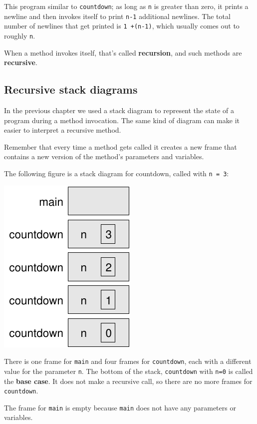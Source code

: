This program similar to {\tt countdown}; as long as {\tt n} is greater than zero, it prints a newline and then invokes itself to print {\tt n-1} additional newlines.
The total number of newlines that get printed is {\tt 1 +(n-1)}, which usually comes out to roughly {\tt n}.


When a method invokes itself, that's called {\bf recursion}, and such methods are {\bf recursive}.

\subsection{Recursive stack diagrams}


In the previous chapter we used a stack diagram to represent the state of a program during a method invocation.
The same kind of diagram can make it easier to interpret a recursive method.

Remember that every time a method gets called it creates a new frame that contains a new version of the method's parameters and variables.

The following figure is a stack diagram for countdown, called with {\tt n = 3}:

\begin{center}
\includegraphics{stack2.pdf}
\end{center}

There is one frame for {\tt main} and four frames for {\tt countdown}, each with a different value for the parameter {\tt n}.
The bottom of the stack, {\tt countdown} with {\tt n=0} is called the {\bf base case}.
It does not make a recursive call, so there are no more frames for {\tt countdown}.

The frame for {\tt main} is empty because {\tt main} does not have any parameters or variables.
